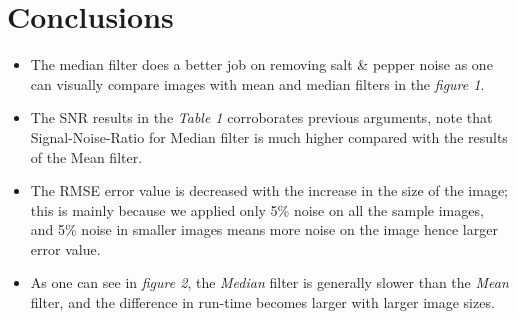 \documentclass[a4paper,11pt]{article}
\begin{document}
\section*{Conclusions}
\begin{itemize}
    \item The median filter does a better job on removing salt \& pepper noise as one can visually compare images with mean and median filters in the \emph{figure 1}.
    \item The SNR results in the \emph{Table 1} corroborates previous arguments, note that Signal-Noise-Ratio for Median filter is much higher compared with the results of the Mean filter.
    \item The RMSE error value is decreased with the increase in the size of the image; this is mainly because we applied only 5\% noise on all the sample images, and 5\% noise in smaller images means more noise on the image hence larger error value.
    \item As one can see in \emph{figure 2}, the \emph{Median} filter is generally slower than the \emph{Mean} filter, and the difference in run-time becomes larger with larger image sizes.
\end{itemize}
\end{document}
